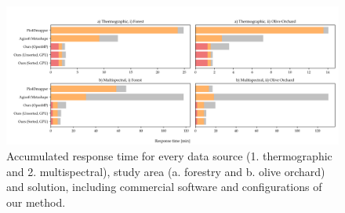 \begin{figure}[ht]
    \centering
    \includegraphics[width=\linewidth]{figs/multi_thermal_projection/results/stacked_global_time.png}
    \caption{Accumulated response time for every data source (1. thermographic and 2. multispectral), study area (a. forestry and b. olive orchard) and solution, including commercial software and configurations of our method. }
    \label{fig:occlusion_results_global_time}
\end{figure}

\newcommand\numExperiments{4}


